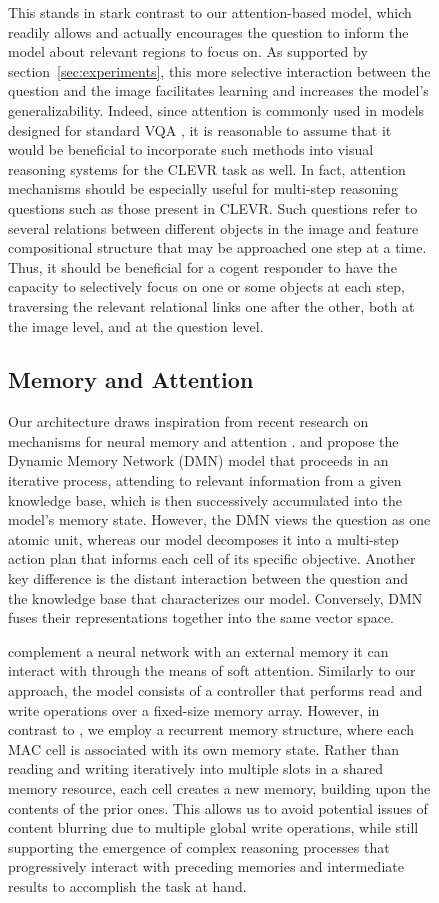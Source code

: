 \documentclass[fleqn]{article}
\newcommand{\secref}[1]{section~\ref{sec:#1}}
\begin{document}
\begin{figure}[t]
\begin{minipage}{0.55\textwidth}
This stands in stark contrast to our attention-based model, which readily allows and actually encourages the question to inform the model about relevant regions to focus on. As supported by \secref{experiments}, this more selective interaction between the question and the image facilitates learning and increases the model's generalizability. Indeed, since attention is commonly used in models designed for standard VQA \citep{vqa, vqaSurv,coatt,saAtt}, it is reasonable to assume that it would be beneficial to incorporate such methods into visual reasoning systems for the CLEVR task as well. In fact, attention mechanisms should be especially useful for multi-step reasoning questions such as those present in CLEVR. Such questions refer to several relations between different objects in the image and feature compositional structure that may be approached one step at a time. Thus, it should be beneficial for a cogent responder to have the capacity to selectively focus on one or some objects at each step, traversing the relevant relational links one after the other, both at the image level, and at the question level.

\subsection{Memory and Attention}
Our architecture draws inspiration from recent research on mechanisms for neural memory and attention \citep{dmn,vdmn,ntm,dnc}. \citet{dmn} and \citet{vdmn} propose the Dynamic Memory Network (DMN) model that proceeds in an iterative process, attending to relevant information from a given knowledge base, which is then successively accumulated into the model's memory state. However, the DMN views the question as one atomic unit, whereas our model decomposes it into a multi-step action plan that informs each cell of its specific objective. Another key difference is the distant interaction between the question and the knowledge base that characterizes our model. Conversely, DMN fuses their representations together into the same vector space.

\citet{ntm,dnc} complement a neural network with an external memory it can interact with through the means of soft attention. Similarly to our approach, the model consists of a controller that performs read and write operations over a fixed-size memory array. However, in contrast to \citet{ntm,dnc}, we employ a recurrent memory structure, where each MAC cell is associated with its own memory state. Rather than reading and writing iteratively into multiple slots in a shared memory resource, each cell creates a new memory, building upon the contents of the prior ones. This allows us to avoid potential issues of content blurring due to multiple global write operations, while still supporting the emergence of complex reasoning processes that progressively interact with preceding memories and intermediate results to accomplish the task at hand.


\end{minipage}
\end{figure}
\end{document}
